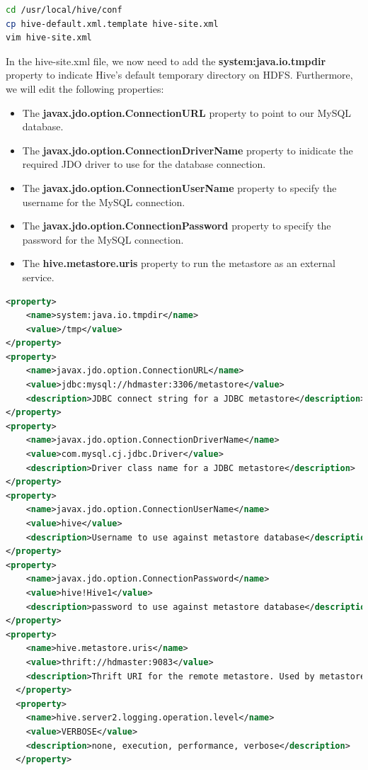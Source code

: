 \documentclass[12pt,english]{book}
\begin{document}
\begin{lstlisting}[language=bash, frame=single, basicstyle=\footnotesize]
cd /usr/local/hive/conf
cp hive-default.xml.template hive-site.xml
vim hive-site.xml 
\end{lstlisting}

In the hive-site.xml file, we now need to add the \textbf{system:java.io.tmpdir} property to indicate Hive's default temporary directory on HDFS.
Furthermore, we will edit the following properties:
\begin{itemize}
\item
The \textbf{javax.jdo.option.ConnectionURL} property to point to our MySQL database.
\item
The \textbf{javax.jdo.option.ConnectionDriverName} property to inidicate the required JDO driver to use for the database connection.
\item
The \textbf{javax.jdo.option.ConnectionUserName} property to specify the username for the MySQL connection.
\item
The \textbf{javax.jdo.option.ConnectionPassword} property to specify the password for the MySQL connection.
\item
The \textbf{hive.metastore.uris} property to run the metastore as an external service.
\end{itemize}
\begin{lstlisting}[language=XML, frame=single, basicstyle=\footnotesize, breaklines=true, postbreak=\mbox{\textcolor{red}{$\hookrightarrow$}\space}]
<property>
    <name>system:java.io.tmpdir</name>
    <value>/tmp</value>
</property>
<property>
    <name>javax.jdo.option.ConnectionURL</name>
    <value>jdbc:mysql://hdmaster:3306/metastore</value>
    <description>JDBC connect string for a JDBC metastore</description>
</property>
<property>
    <name>javax.jdo.option.ConnectionDriverName</name>
    <value>com.mysql.cj.jdbc.Driver</value>
    <description>Driver class name for a JDBC metastore</description>
</property>
<property>
    <name>javax.jdo.option.ConnectionUserName</name>
    <value>hive</value>
    <description>Username to use against metastore database</description>
</property>
<property>
    <name>javax.jdo.option.ConnectionPassword</name>
    <value>hive!Hive1</value>
    <description>password to use against metastore database</description>
</property>
<property>
    <name>hive.metastore.uris</name>
    <value>thrift://hdmaster:9083</value>
    <description>Thrift URI for the remote metastore. Used by metastore client to connect to remote metastore.</description>
  </property>
  <property>
    <name>hive.server2.logging.operation.level</name>
    <value>VERBOSE</value>
    <description>none, execution, performance, verbose</description>
  </property>
\end{lstlisting}
\end{document}
